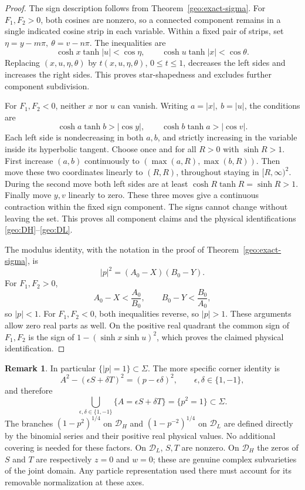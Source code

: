 \documentclass[11pt]{article}
\numberwithin{equation}{section}
\theoremstyle{definition}
\newtheorem{remark}[theorem]{Remark}
\renewcommand{\DH}{\mathcal D_H}
\newcommand{\DL}{\mathcal D_L}
\begin{document}
\begin{proof}
The sign description follows from Theorem~\ref{geo:exact-sigma}.
For \(F_1,F_2>0\), both cosines are nonzero, so a connected
component remains in a single indicated cosine strip in each
variable.  Within a fixed pair of strips, set
\(\eta=y-m\pi,\ \theta=v-n\pi\).  The inequalities are
\[
 \cosh x\tanh|u|<\cos\eta,\qquad
 \cosh u\tanh|x|<\cos\theta.
\]
Replacing \((x,u,\eta,\theta)\) by
\(t(x,u,\eta,\theta)\), \(0\leq t\leq1\), decreases the
left sides and increases the right sides.  This proves
star-shapedness and excludes further component subdivision.

For \(F_1,F_2<0\), neither \(x\) nor \(u\) can vanish.
Writing \(a=|x|,\ b=|u|\), the conditions are
\[
 \cosh a\tanh b>|\cos y|,\qquad
 \cosh b\tanh a>|\cos v|.
\]
Each left side is nondecreasing in both \(a,b\), and strictly
increasing in the variable inside its hyperbolic tangent.
Choose once and for all \(R>0\) with \(\sinh R>1\).
First increase \((a,b)\) continuously to
\((\max(a,R),\max(b,R))\).  Then move these two coordinates
linearly to \((R,R)\), throughout staying in \([R,\infty)^2\).
During the second move both left sides are at least
\(\cosh R\tanh R=\sinh R>1\).  Finally move \(y,v\) linearly
to zero.  These three moves give a continuous contraction
within the fixed sign component.  The signs cannot change
without leaving the set.  This proves all component claims
and the physical identifications \eqref{geo:DH}--\eqref{geo:DL}.

The modulus identity, with the notation in the proof of
Theorem~\ref{geo:exact-sigma}, is
\begin{equation}\label{geo:p-modulus}
                  |p|^2=(A_0-X)(B_0-Y).
\end{equation}
For \(F_1,F_2>0\),
\[
 A_0-X<\frac{A_0}{B_0},\qquad
 B_0-Y<\frac{B_0}{A_0},
\]
so \(|p|<1\).  For \(F_1,F_2<0\), both inequalities reverse,
so \(|p|>1\).  These arguments allow zero real parts as well.
On the positive real quadrant the common sign of \(F_1,F_2\)
is the sign of \(1-(\sinh x\sinh u)^2\), which proves the
claimed physical identification.
\end{proof}

\begin{remark}\label{geo:algebraic-branches}
In particular \(\{|p|=1\}\subset\Sigma\).  The more specific
corner identity is
\[
 A^2-(\epsilon S+\delta T)^2=(p-\epsilon\delta)^2,
 \qquad \epsilon,\delta\in\{1,-1\},
\]
and therefore
\[
 \bigcup_{\epsilon,\delta\in\{1,-1\}}
 \{A=\epsilon S+\delta T\}=\{p^2=1\}\subset\Sigma.
\]
The branches \((1-p^2)^{1/4}\) on \(\DH\) and
\((1-p^{-2})^{1/4}\) on \(\DL\) are defined directly by the
binomial series and their positive real physical values.
No additional covering is needed for these factors.
On \(\DL\), \(S,T\) are nonzero.  On \(\DH\) the zeros of
\(S\) and \(T\) are respectively \(z=0\) and \(w=0\);
these are genuine complex subvarieties of the joint domain.
Any particle representation used there must account for
its removable normalization at these axes.
\end{remark}
\end{document}
